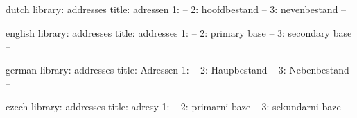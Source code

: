 

\unprotect

\startmessages  dutch  library: addresses
  title: adressen
      1: --
      2: hoofdbestand --
      3: nevenbestand --
\stopmessages

\startmessages  english  library: addresses
  title: addresses
      1: --
      2: primary base --
      3: secondary base --
\stopmessages

\startmessages  german  library: addresses
  title: Adressen
      1: --
      2: Haupbestand --
      3: Nebenbestand --
\stopmessages

\startmessages  czech  library: addresses
  title: adresy
      1: --
      2: primarni baze --
      3: sekundarni baze --
\stopmessages


